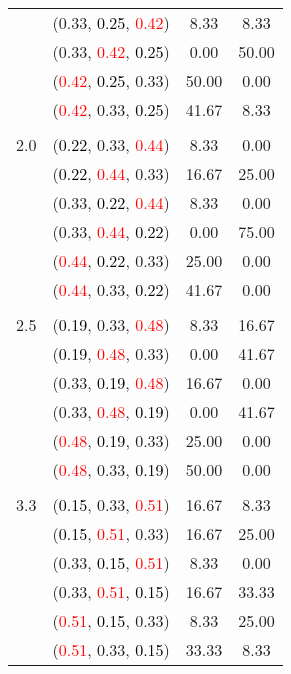 \documentclass[10pt,a4paper]{report}
\begin{document}
\begin{center}
\begin{longtable}{clcc}
			&(0.33, \textcolor{black}{0.25}, \textcolor{red}{0.42})&8.33&8.33\\
			&(0.33, \textcolor{red}{0.42}, \textcolor{black}{0.25})&0.00&50.00\\
			&(\textcolor{red}{0.42}, \textcolor{black}{0.25}, 0.33)&50.00&0.00\\
			&(\textcolor{red}{0.42}, 0.33, \textcolor{black}{0.25})&41.67&8.33\\
		&&&\\
		2.0			&(\textcolor{black}{0.22}, 0.33, \textcolor{red}{0.44})&8.33&0.00\\
			&(\textcolor{black}{0.22}, \textcolor{red}{0.44}, 0.33)&16.67&25.00\\
			&(0.33, \textcolor{black}{0.22}, \textcolor{red}{0.44})&8.33&0.00\\
			&(0.33, \textcolor{red}{0.44}, \textcolor{black}{0.22})&0.00&75.00\\
			&(\textcolor{red}{0.44}, \textcolor{black}{0.22}, 0.33)&25.00&0.00\\
			&(\textcolor{red}{0.44}, 0.33, \textcolor{black}{0.22})&41.67&0.00\\
		&&&\\
		2.5			&(\textcolor{black}{0.19}, 0.33, \textcolor{red}{0.48})&8.33&16.67\\
			&(\textcolor{black}{0.19}, \textcolor{red}{0.48}, 0.33)&0.00&41.67\\
			&(0.33, \textcolor{black}{0.19}, \textcolor{red}{0.48})&16.67&0.00\\
			&(0.33, \textcolor{red}{0.48}, \textcolor{black}{0.19})&0.00&41.67\\
			&(\textcolor{red}{0.48}, \textcolor{black}{0.19}, 0.33)&25.00&0.00\\
			&(\textcolor{red}{0.48}, 0.33, \textcolor{black}{0.19})&50.00&0.00\\
		&&&\\
		3.3			&(\textcolor{black}{0.15}, 0.33, \textcolor{red}{0.51})&16.67&8.33\\
			&(\textcolor{black}{0.15}, \textcolor{red}{0.51}, 0.33)&16.67&25.00\\
			&(0.33, \textcolor{black}{0.15}, \textcolor{red}{0.51})&8.33&0.00\\
			&(0.33, \textcolor{red}{0.51}, \textcolor{black}{0.15})&16.67&33.33\\
			&(\textcolor{red}{0.51}, \textcolor{black}{0.15}, 0.33)&8.33&25.00\\
			&(\textcolor{red}{0.51}, 0.33, \textcolor{black}{0.15})&33.33&8.33\\
		\bottomrule
	\end{longtable}
\end{center}
\end{document}
